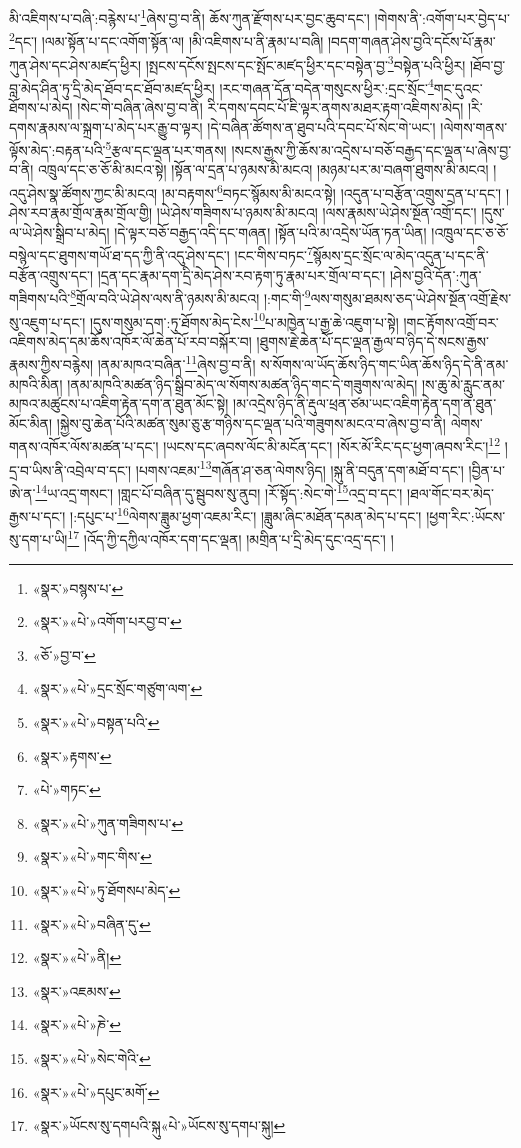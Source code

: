 མི་འཇིགས་པ་བཞི་:བརྙེས་པ་\footnote{«སྣར་»བསྙས་པ་}ཞེས་བྱ་བ་ནི། ཆོས་ཀུན་རྫོགས་པར་བྱང་ཆུབ་དང་། །གེགས་ནི་:འགོག་པར་བྱེད་པ་\footnote{«སྣར་»«པེ་»འགོག་པརབྱ་བ་}དང་། །ལམ་སྟོན་པ་དང་འགོག་སྟོན་ལ། །མི་འཇིགས་པ་ནི་རྣམ་པ་བཞི། །བདག་གཞན་ཤེས་བྱའི་དངོས་པོ་རྣམ་ཀུན་ཤེས་དང་ཤེས་མཛད་ཕྱིར། །སྤངས་དངོས་སྤངས་དང་སྤོང་མཛད་ཕྱིར་དང་བསྟེན་བྱ་\footnote{«ཅོ་»བྱ་བ་}བསྟེན་པའི་ཕྱིར། །ཐོབ་བྱ་བླ་མེད་ཤིན་ཏུ་དྲི་མེད་ཐོབ་དང་ཐོབ་མཛད་ཕྱིར། །རང་གཞན་དོན་བདེན་གསུངས་ཕྱིར་:དྲང་སྲོང་\footnote{«སྣར་»«པེ་»དྲང་སྲོང་གཙུག་ལག་}གང་དུའང་ཐོགས་པ་མེད། །སེང་གེ་བཞིན་ཞེས་བྱ་བ་ནི། རི་དགས་དབང་པོ་ཇི་ལྟར་ནགས་མཐར་རྟག་འཇིགས་མེད། །རི་དགས་རྣམས་ལ་སྐྲག་པ་མེད་པར་རྒྱུ་བ་ལྟར། །དེ་བཞིན་ཚོགས་ན་ཐུབ་པའི་དབང་པོ་སེང་གེ་ཡང་། །ལེགས་གནས་ལྟོས་མེད་:བརྟན་པའི་\footnote{«སྣར་»«པེ་»བསྟན་པའི་}རྩལ་དང་ལྡན་པར་གནས། །སངས་རྒྱས་ཀྱི་ཆོས་མ་འདྲེས་པ་བཅོ་བརྒྱད་དང་ལྡན་པ་ཞེས་བྱ་བ་ནི། འཁྲུལ་དང་ཅ་ཅོ་མི་མངའ་སྟེ། །སྟོན་ལ་དྲན་པ་ཉམས་མི་མངའ། །མཉམ་པར་མ་བཞག་ཐུགས་མི་མངའ། །འདུ་ཤེས་སྣ་ཚོགས་ཀྱང་མི་མངའ། །མ་བརྟགས་\footnote{«སྣར་»རྟགས་}བཏང་སྙོམས་མི་མངའ་སྟེ། །འདུན་པ་བརྩོན་འགྲུས་དྲན་པ་དང་། །ཤེས་རབ་རྣམ་གྲོལ་རྣམ་གྲོལ་གྱི། །ཡེ་ཤེས་གཟིགས་པ་ཉམས་མི་མངའ། །ལས་རྣམས་ཡེ་ཤེས་སྔོན་འགྲོ་དང་། །དུས་ལ་ཡེ་ཤེས་སྒྲིབ་པ་མེད། །དེ་ལྟར་བཅོ་བརྒྱད་འདི་དང་གཞན། །སྟོན་པའི་མ་འདྲེས་ཡོན་ཏན་ཡིན། །འཁྲུལ་དང་ཅ་ཅོ་བསྙེལ་དང་ཐུགས་གཡོ་ཐ་དད་ཀྱི་ནི་འདུ་ཤེས་དང་། །ངང་གིས་བཏང་\footnote{«པེ་»གཏང་}སྙོམས་དྲང་སྲོང་ལ་མེད་འདུན་པ་དང་ནི་བརྩོན་འགྲུས་དང་། །དྲན་དང་རྣམ་དག་དྲི་མེད་ཤེས་རབ་རྟག་ཏུ་རྣམ་པར་གྲོལ་བ་དང་། །ཤེས་བྱའི་དོན་:ཀུན་གཟིགས་པའི་\footnote{«སྣར་»«པེ་»ཀུན་གཟིགས་པ་}གྲོལ་བའི་ཡེ་ཤེས་ལས་ནི་ཉམས་མི་མངའ། །:གང་གི་\footnote{«སྣར་»«པེ་»གང་གིས་}ལས་གསུམ་ཐམས་ཅད་ཡེ་ཤེས་སྔོན་འགྲོ་རྗེས་སུ་འཇུག་པ་དང་། །དུས་གསུམ་དག་:ཏུ་ཐོགས་མེད་ངེས་\footnote{«སྣར་»«པེ་»ཏུ་ཐོགསཔ་མེད་}པ་མཁྱེན་པ་རྒྱ་ཆེ་འཇུག་པ་སྟེ། །གང་རྟོགས་འགྲོ་བར་འཇིགས་མེད་དམ་ཆོས་འཁོར་ལོ་ཆེན་པོ་རབ་བསྐོར་བ། །ཐུགས་རྗེ་ཆེན་པོ་དང་ལྡན་རྒྱལ་བ་ཉིད་དེ་སངས་རྒྱས་རྣམས་ཀྱིས་བརྙེས། །ནམ་མཁའ་བཞིན་\footnote{«སྣར་»«པེ་»བཞིན་དུ་}ཞེས་བྱ་བ་ནི། ས་སོགས་ལ་ཡོད་ཆོས་ཉིད་གང་ཡིན་ཆོས་ཉིད་དེ་ནི་ནམ་མཁའི་མིན། །ནམ་མཁའི་མཚན་ཉིད་སྒྲིབ་མེད་ལ་སོགས་མཚན་ཉིད་གང་དེ་གཟུགས་ལ་མེད། །ས་ཆུ་མེ་རླུང་ནམ་མཁའ་མཚུངས་པ་འཇིག་རྟེན་དག་ན་ཐུན་མོང་སྟེ། །མ་འདྲེས་ཉིད་ནི་རྡུལ་ཕྲན་ཙམ་ཡང་འཇིག་རྟེན་དག་ན་ཐུན་མོང་མིན། །སྐྱེས་བུ་ཆེན་པོའི་མཚན་སུམ་ཅུ་རྩ་གཉིས་དང་ལྡན་པའི་གཟུགས་མངའ་བ་ཞེས་བྱ་བ་ནི། ལེགས་གནས་འཁོར་ལོས་མཚན་པ་དང་། །ཡངས་དང་ཞབས་ལོང་མི་མངོན་དང་། །སོར་མོ་རིང་དང་ཕྱག་ཞབས་རིང་།\footnote{«སྣར་»«པེ་»ནི།} །དྲ་བ་ཡིས་ནི་འབྲེལ་བ་དང་། །པགས་འཇམ་\footnote{«སྣར་»འཇམས་}གཞོན་ཤ་ཅན་ལེགས་ཉིད། །སྐུ་ནི་བདུན་དག་མཐོ་བ་དང་། །བྱིན་པ་ཨེ་ན་\footnote{«སྣར་»«པེ་»ཎེ་}ཡ་འདྲ་གསང་། །གླང་པོ་བཞིན་དུ་སྦུབས་སུ་ནུབ། །རོ་སྟོད་:སེང་གེ་\footnote{«སྣར་»«པེ་»སེང་གེའི་}འདྲ་བ་དང་། །ཐལ་གོང་བར་མེད་རྒྱས་པ་དང་། །:དཔུང་པ་\footnote{«སྣར་»«པེ་»དཔུང་མགོ་}ལེགས་ཟླུམ་ཕྱག་འཇམ་རིང་། །ཟླུམ་ཞིང་མཐོན་དམན་མེད་པ་དང་། །ཕྱག་རིང་:ཡོངས་སུ་དག་པ་ཡི།\footnote{«སྣར་»ཡོངས་སུ་དགཔའི་སྐུ«པེ་»ཡོངས་སུ་དགཔ་སྐུ།} །འོད་ཀྱི་དཀྱིལ་འཁོར་དག་དང་ལྡན། །མགྲིན་པ་དྲི་མེད་དུང་འདྲ་དང་། །
